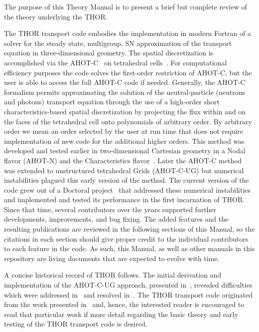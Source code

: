 The purpose of this Theory Manual is to present a brief but complete review of the theory underlying the \ac{THOR}.

The \ac{THOR} transport code embodies the implementation in modern Fortran of a solver for the steady state, multigroup, \ac{SN} approximation of the transport equation in three-dimensional geometry.
The spatial discretization is accomplished via the \ac{AHOT-C}~\cite{Azmy1992} on tetrahedral cells~\cite{Ferrer2012}.
For computational efficiency purposes the code solves the first-order restriction of \ac{AHOT-C}, but the user is able to access the full \ac{AHOT-C} code if needed.
Generally, the \ac{AHOT-C} formalism permits approximating the solution of the neutral-particle (neutrons and photons) transport equation through the use of a high-order short characteristics-based spatial discretization by projecting the flux within and on the faces of the tetrahedral cell onto polynomials of arbitrary order.
By arbitrary order we mean an order selected by the user at run time that does not require implementation of new code for the additional higher orders.
This method was developed and tested earlier in two-dimensional Cartesian geometry in a Nodal flavor (\acs{AHOT-N})\cite{Azmy1988a} and the Characteristics flavor~\cite{Azmy1992}.
Later the \ac{AHOT-C} method was extended to unstructured tetrahedral Grids (\acs{AHOT-C-UG}) but numerical instabilities plagued this early version of the method.
The current version of the code grew out of a Doctoral project~\cite{FerrerPhD} that addressed these numerical instabilities and implemented and tested its performance in the first incarnation of \ac{THOR}.
Since that time, several contributors over the years supported further developments, improvements, and bug fixing.
The added features and the resulting publications are reviewed in the following sections of this Manual, so the citations in each section should give proper credit to the individual contributors to each feature in the code.
As such, this Manual, as well as other manuals in this repository are living documents that are expected to evolve with time.

A concise historical record of \ac{THOR} follows.
The initial derivation and implementation of the \acs{AHOT-C-UG} approach, presented in~\cite{Azmy2001}, revealed difficulties which were addressed in~\cite{Ferrer2009} and resolved in~\cite{FerrerPhD}.
The \ac{THOR} transport code originated from the work presented in~\cite{FerrerPhD} and, hence, the interested reader is encouraged to read that particular work if more detail regarding the basic theory and early testing of the \ac{THOR} transport code is desired.

